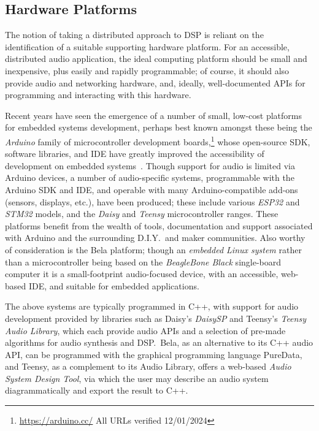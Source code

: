 \subsection{Hardware Platforms}\label{subsec:hardware-platforms}

The notion of taking a distributed approach to DSP is reliant on the
identification of a suitable supporting hardware platform.
For an accessible, distributed audio application, the ideal computing platform
should be small and inexpensive, plus easily and rapidly programmable;
of course, it should also provide audio and networking hardware, and, ideally,
well-documented APIs for programming and interacting with this hardware.

Recent years have seen the emergence of a number of small, low-cost platforms
for embedded systems development, perhaps best known amongst these being the
\textit{Arduino} family of microcontroller development boards,\footnote{
    \url{https://arduino.cc/} \textemdash{} All URLs verified 12/01/2024
}
whose open-source SDK, software libraries, and IDE have greatly improved the
accessibility of development on embedded systems~\citep{michon_embedded_2020}.
Though support for audio is limited via Arduino devices, a number of
audio-specific systems, programmable with the Arduino SDK and IDE, and
operable with many Arduino-compatible add-ons (sensors, displays, etc.), have
been produced;
these include various \textit{ESP32} and \textit{STM32} models, and the
\textit{Daisy} and \textit{Teensy} microcontroller ranges.
These platforms benefit from the wealth of tools, documentation and support
associated with Arduino and the surrounding D.I.Y.\ and maker communities.
Also worthy of consideration is the Bela platform;
though an \textit{embedded Linux system} rather than a microcontroller
\textemdash{} being based on the \textit{BeagleBone Black} single-board computer
\textemdash{} it is a small-footprint audio-focused device, with an accessible,
web-based IDE, and suitable for embedded applications.

The above systems are typically programmed in C++, with support for audio
development provided by libraries such as Daisy's \textit{DaisySP} and Teensy's
\textit{Teensy Audio Library}, which each provide audio APIs and a selection of
pre-made algorithms for audio synthesis and DSP.\
Bela, as an alternative to its C++ audio API, can be programmed with the
graphical programming language PureData, and Teensy, as a complement to its
Audio Library, offers a web-based \textit{Audio System Design Tool}, via which
the user may describe an audio system diagrammatically and export the result to
C++.

